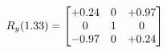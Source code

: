 \documentclass[preview]{standalone}
\begin{document}
\begin{align*}
\special{dvisvgm:raw <g id='unique000'>}R_{y}(1.33) = \begin{bmatrix}+0.24 & 0 & +0.97 \\0 & 1 & 0 \\-0.97 & 0 & +0.24\end{bmatrix}\special{dvisvgm:raw </g>}
\end{align*}
\end{document}
